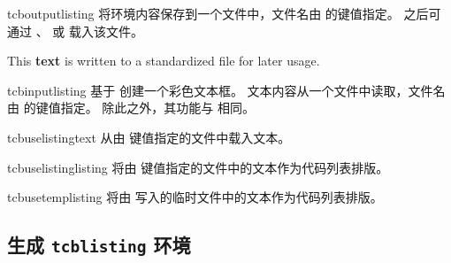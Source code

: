 \clearpage
\begin{docEnvironment}{tcboutputlisting}{}
  将环境内容保存到一个文件中，文件名由  的键值指定。
  之后可通过 、
  或  载入该文件。
\begin{dispListing}
\begin{tcboutputlisting}
This \textbf{text} is written to a standardized file for later usage.
\end{tcboutputlisting}
\end{dispListing}
\end{docEnvironment}


\begin{docCommand}{tcbinputlisting}{}
  基于  创建一个彩色文本框。
  文本内容从一个文件中读取，文件名由  的键值指定。
  除此之外，其功能与  相同。
\begin{dispExample}
\end{dispExample}
\end{docCommand}

\begin{docCommand}{tcbuselistingtext}{}
  从由  键值指定的文件中载入文本。
\begin{dispExample}
\tcbuselistingtext
\end{dispExample}
\end{docCommand}


\begin{docCommand}{tcbuselistinglisting}{}
  将由  键值指定的文件中的文本作为代码列表排版。
\begin{dispExample}
\tcbuselistinglisting
\end{dispExample}
\end{docCommand}

\begin{docCommand}{tcbusetemplisting}{}
  将由  写入的临时文件中的文本作为代码列表排版。
\end{docCommand}


\clearpage
\subsection{生成 \texttt{tcblisting} 环境}\label{subsec:listing_newlistings}

